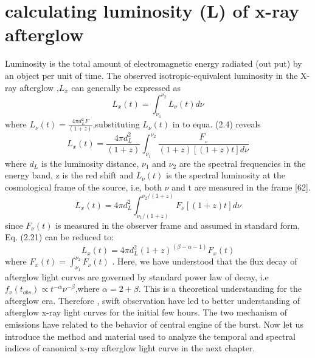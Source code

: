 \section{calculating luminosity (L) of x-ray afterglow}
Luminosity is the total amount of electromagnetic energy radiated (out put) by an  object per unit of time. The observed isotropic-equivalent luminosity in the X-ray afterglow ,$ L_{x} $ can generally be expressed as 
\begin{equation}
L_{x}(t)= \int_{\nu_{1}}^{\nu_{2}} L_{\nu}(t)d\nu
\end{equation}
 where $ L_{\nu}(t)=\frac{4 \pi d_{L}^{2} F}{(1+z)} $,substituting  $L_{\nu}(t)$ in to equa. (2.4) reveals 
 \begin{equation}
 L_{x}(t)=\frac{4 \pi d_{L}^{2}}{(1+z)}\int_{\nu_{1}}^{\nu_{2}}\frac{F_{_{\nu}}}{(1+z)[(1+z)t]d\nu} 
 \end{equation}
where $ d_{L} $ is the luminosity distance, $\nu_{1}$  and $ \nu_{2} $ are the spectral frequencies in the energy band, z is the red shift and $ L_{\nu}  (t) $ is the spectral luminosity at the cosmological frame of the source, i.e, both $\nu $ and t are  measured in the frame [62].
\begin{equation}
L_{x}(t) = 4\pi d_{L}^{2}\int_{\nu_{1}/(1+z)}^{\nu_{2}/(1+z)}F_{\nu}[(1+z)t]d\nu
\end{equation}
since $F_{\nu}  (t) $ is measured in the observer frame and assumed in standard form, Eq. (2.21) can be reduced to:
\begin{equation}
L_{x}(t) = 4\pi d_{L}^{2}(1+z)^{(\beta-\alpha -1)} F_{x}(t)
\end{equation}
where $ F_{x}(t)  = \int _{\nu_{1}} ^{\nu_{2}}F_{\nu}(t)$ .
Here, we have understood that the flux decay of afterglow light curves are governed by standard power law of decay, i.e $ f _{\nu}(t_{obs})  \propto t^{-\alpha} \nu^{-\beta} $,where $ \alpha = 2+\beta $. This is a theoretical understanding for the afterglow era. Therefore , swift observation have led to  better understanding of afterglow  x-ray light curves for the initial few hours. The two mechanism of emissions have related to the behavior of central engine of the burst. Now let us introduce the method and material used to  analyze the temporal and spectral indices of canonical x-ray  afterglow  light curve in the next chapter.\\

